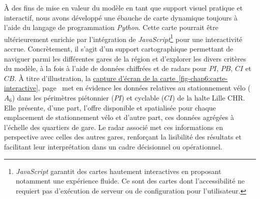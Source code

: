 \begin{refsegment}
À des fins de mise en valeur du modèle en tant que support visuel pratique et interactif, nous avons développé une ébauche de carte dynamique toujours à l’aide du langage de programmation \textsl{Python}. Cette carte pourrait être ultérieurement enrichie par l’intégration de \textsl{JavaScript}\footnote{
    \textsl{JavaScript} garantit des cartes hautement interactives en proposant notamment une expérience fluide. Ce sont des cartes dont l'accessibilité ne requiert pas d'exécution de serveur ou de configuration pour l'utilisateur.
} pour une interactivité accrue. Concrètement, il s’agit d’un support cartographique permettant de naviguer parmi les différentes gares de la région et d’explorer les divers critères du modèle, à la fois à l'aide de données chiffrées et de radars pour \(PI\), \(PB\), \(CI\) et \(CB\). À titre d’illustration, la \hyperref[fig-chap6:carte-interactive]{capture d'écran de la carte~\ref{fig-chap6:carte-interactive}}, page~\pageref{fig-chap6:carte-interactive} met en évidence les données relatives au stationnement vélo (\(A_{6}\)) dans les périmètres piétonnier (\(PI\)) et cyclable (\(CI\)) de la halte Lille CHR. Elle présente, d’une part, l’offre disponible et spatialisée pour chaque emplacement de stationnement vélo et d’autre part, ces données agrégées à l’échelle des quartiers de gare. Le radar associé met ces informations en perspective avec celles des autres gares, renforçant la lisibilité des résultats et facilitant leur interprétation dans un cadre décisionnel ou opérationnel.%


\end{refsegment}
